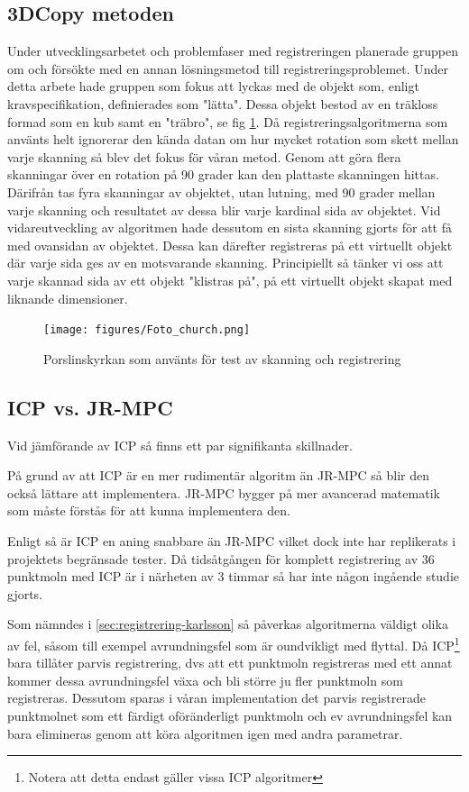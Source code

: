 \subsection{3DCopy metoden}
Under utvecklingsarbetet och problemfaser med registreringen planerade gruppen om och försökte med en annan lösningsmetod till registreringsproblemet. Under detta arbete hade gruppen som fokus att lyckas med de objekt som, enligt kravspecifikation, definierades som "lätta". Dessa objekt bestod av en träkloss formad som en kub samt en "träbro", se fig \ref{fig:foto_church}. Då registreringsalgoritmerna som använts helt ignorerar den kända datan om hur mycket rotation som skett mellan varje skanning så blev det fokus för våran metod. Genom att göra flera skanningar över en rotation på 90 grader kan den plattaste skanningen hittas. Därifrån tas fyra skanningar av objektet, utan lutning, med 90 grader mellan varje skanning och resultatet av dessa blir varje kardinal sida av objektet. Vid vidareutveckling av algoritmen hade dessutom en sista skanning gjorts för att få med ovansidan av objektet. Dessa kan därefter registreras på ett virtuellt objekt där varje sida ges av en motsvarande skanning. Principiellt så tänker vi oss att varje skannad sida av ett objekt "klistras på", på ett virtuellt objekt skapat med liknande dimensioner. 

\begin{figure}[H]
	\centering
	\texttt{[image: figures/Foto\_church.png]}
	\caption{Porslinskyrkan som använts för test av skanning och registrering}
	\label{fig:foto_church}
\end{figure}

\subsection{ICP vs. JR-MPC}

Vid jämförande av ICP så finns ett par signifikanta skillnader. 

På grund av att ICP är en mer rudimentär algoritm än JR-MPC så blir den också lättare att implementera. JR-MPC bygger på mer avancerad matematik som måste förstås för att kunna implementera den.

Enligt \cite{Evangelidis-ECCV-2014} så är ICP en aning snabbare än JR-MPC vilket dock inte har replikerats i projektets begränsade tester. Då tidsåtgången för komplett registrering av 36 punktmoln med ICP är i närheten av 3 timmar så har inte någon ingående studie gjorts. 

Som nämndes i \ref{sec:registrering-karlsson} så påverkas algoritmerna väldigt olika av fel, såsom till exempel avrundningsfel som är oundvikligt med flyttal. Då ICP\footnote{Notera att detta endast gäller vissa ICP algoritmer} bara tillåter parvis registrering, dvs att ett punktmoln registreras med ett annat kommer dessa avrundningsfel växa och bli större ju fler punktmoln som registreras. Dessutom sparas i våran implementation det parvis registrerade punktmolnet som ett färdigt oföränderligt punktmoln och ev avrundningsfel kan bara elimineras genom att köra algoritmen igen med andra parametrar.

